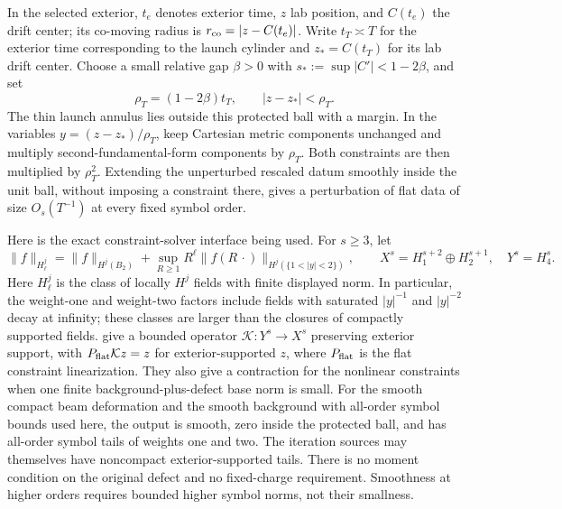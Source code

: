 In the selected exterior, $t_e$ denotes exterior time, $z$ lab
position, and $C(t_e)$ the drift center; its co-moving radius is
$r_{\rm co}=|z-C(t_e)|$.
Write $t_T\asymp T$ for the exterior time corresponding to the
launch cylinder and $z_*=C(t_T)$ for its lab drift center. Choose
a small relative gap $\beta>0$ with
$s_*:=\sup|C'|<1-2\beta$, and set
\begin{equation}\label{pk:protected}
 \rho_T=(1-2\beta)t_T,\qquad |z-z_*|<\rho_T.
\end{equation}
The thin launch annulus lies outside this protected ball with a
margin. In the variables $y=(z-z_*)/\rho_T$, keep Cartesian metric
components unchanged and multiply second-fundamental-form
components by $\rho_T$. Both constraints are then multiplied by
$\rho_T^2$. Extending the unperturbed rescaled datum smoothly
inside the unit ball, without imposing a constraint there, gives
a perturbation of flat data of size $O_s(T^{-1})$ at every fixed
symbol order.

Here is the exact constraint-solver interface being used. For
$s\ge3$, let
\[
 \|f\|_{H^j_\ell}=\|f\|_{H^j(B_2)}+
  \sup_{R\ge1}R^\ell
       \|f(R\,\cdot)\|_{H^j(\{1<|y|<2\})},\qquad
 X^s=H^{s+2}_1\oplus H^{s+1}_2,\quad Y^s=H^s_4.
\]
Here $H^j_\ell$ is the class of locally $H^j$ fields with finite
displayed norm. In particular, the weight-one and weight-two factors
include fields with saturated $|y|^{-1}$ and $|y|^{-2}$ decay at
infinity; these classes are larger than the closures of compactly
supported fields.
\cite[, ]{KerrCTwo} give a bounded
operator $\mathcal K:Y^s\to X^s$ preserving exterior support, with
$P_{\rm flat}\mathcal Kz=z$ for exterior-supported $z$, where
$P_{\rm flat}$ is the flat constraint linearization. They also give a contraction for the nonlinear
constraints when one finite background-plus-defect base norm is
small. For the smooth compact beam deformation and the smooth
background with all-order symbol bounds used here, the output is
smooth, zero inside the protected ball, and has all-order symbol
tails of weights one and two. The iteration sources may themselves
have noncompact exterior-supported tails. There is no
moment condition on the original defect and no fixed-charge
requirement. Smoothness at higher orders requires bounded higher
symbol norms, not their smallness.

